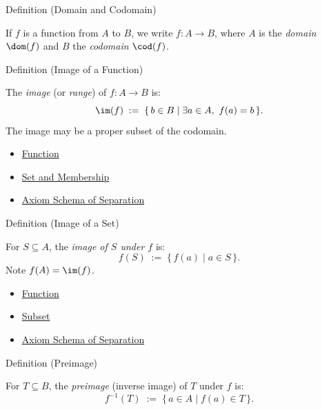 \begin{definitionbox}{Definition (Domain and Codomain)}
\begin{definition}\label{def:domain-codomain}
If $f$ is a function from $A$ to $B$, we write $f : A \to B$, where $A$ is
the \emph{domain} $\dom(f)$ and $B$ the \emph{codomain} $\cod(f)$.
\end{definition}
\end{definitionbox}

\begin{definitionbox}{Definition (Image of a Function)}
\begin{definition}\label{def:image-function}
The \emph{image} (or \emph{range}) of $f : A \to B$ is:
\[
\im(f) \;:=\; \{\, b \in B \mid \exists a \in A,\ f(a)=b \,\}.
\]
The image may be a proper subset of the codomain.
\end{definition}
\end{definitionbox}

\begin{dependencies}
\begin{itemize}
  \item \hyperref[def:function]{Function}
  \item \hyperref[def:set-membership]{Set and Membership}
  \item \hyperref[ax:separation]{Axiom Schema of Separation}
\end{itemize}
\end{dependencies}

\begin{definitionbox}{Definition (Image of a Set)}
\begin{definition}\label{def:image-set}
For $S \subseteq A$, the \emph{image of $S$ under $f$} is:
\[
f(S) \;:=\; \{\, f(a) \mid a \in S \,\}.
\]
Note $f(A) = \im(f)$.
\end{definition}
\end{definitionbox}

\begin{dependencies}
\begin{itemize}
  \item \hyperref[def:function]{Function}
  \item \hyperref[def:subset]{Subset}
  \item \hyperref[ax:separation]{Axiom Schema of Separation}
\end{itemize}
\end{dependencies}

\begin{definitionbox}{Definition (Preimage)}
\begin{definition}[Preimage]\label{def:preimage}
For $T \subseteq B$, the \emph{preimage} (inverse image) of $T$ under $f$ is:
\[
f^{-1}(T) \;:=\; \{\, a \in A \mid f(a) \in T \,\}.
\]
\end{definition}
\end{definitionbox}


